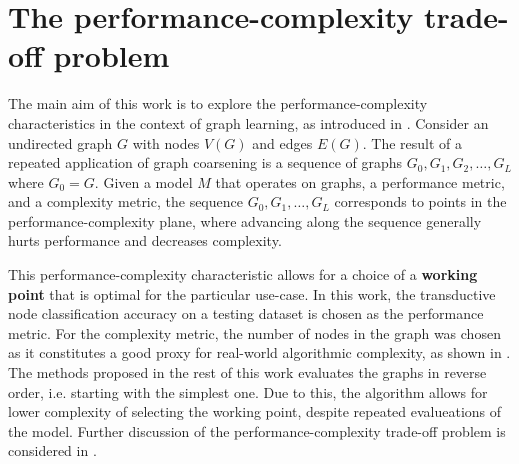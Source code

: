 \section{The performance-complexity trade-off problem}\label{sec:performance-complexity}

The main aim of this work is to explore the performance-complexity characteristics in the context of graph learning, as introduced in \cite{prochazka_downstream_2022}. Consider an undirected graph \( G \) with nodes \( V \left( G \right) \) and edges \( E \left( G \right) \). The result of a repeated application of graph coarsening is a sequence of graphs \( G_0, G_1, G_2, \dots, G_L \) where \( G_0 = G \).
Given a model \( M \) that operates on graphs, a performance metric, and a complexity metric, the sequence \( G_0, G_1, \dots, G_L \) corresponds to points in the performance-complexity plane, where advancing along the sequence generally hurts performance and decreases complexity.

This performance-complexity characteristic allows for a choice of a \textbf{working point} that is optimal for the particular use-case. In this work, the transductive node classification accuracy on a testing dataset is chosen as the performance metric. For the complexity metric, the number of nodes in the graph was chosen as it constitutes a good proxy for real-world algorithmic complexity, as shown in \cite{chiang_cluster-gcn_2019}. The methods proposed in the rest of this work evaluates the graphs in reverse order, i.e. starting with the simplest one. Due to this, the algorithm allows for lower complexity of selecting the working point, despite repeated evalueations of the model. Further discussion of the performance-complexity trade-off problem is considered in \cite{prochazka_downstream_2022}.
